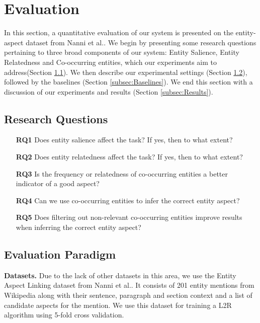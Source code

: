 
\section{Evaluation}
\label{sec:Evaluation}
In this section, a quantitative evaluation of our system is presented on the entity-aspect dataset from Nanni et al.\cite{nanni2018entity}. We begin by presenting some research questions pertaining to three broad components of our system: Entity Salience, Entity Relatedness and Co-occurring entities, which our experiments aim to address(Section \ref{subsec:Research Questions}). We then describe our experimental settings (Section \ref{subsec:Evaluation Paradigm}), followed by the baselines (Section \ref{subsec:Baselines}). We end this section with a discussion of our experiments and results (Section \ref{subsec:Results}).

\subsection{Research Questions}
\label{subsec:Research Questions}

\begin{itemize}
\item[\textbf{RQ1}] Does entity salience affect the task? If yes, then to what extent?
\item[\textbf{RQ2}] Does entity relatedness affect the task? If yes, then to what extent? 
\item[\textbf{RQ3}] Is the frequency or relatedness of co-occurring entities a better indicator of a good aspect?
\item[\textbf{RQ4}] Can we use co-occurring entities to infer the correct entity aspect?
\item[\textbf{RQ5}] Does filtering out non-relevant co-occurring entities improve results when inferring the correct entity aspect?
\end{itemize}

\subsection{Evaluation Paradigm}
\label{subsec:Evaluation Paradigm}

\textbf{Datasets.} Due to the lack of other datasets in this area, we use the Entity Aspect Linking dataset from Nanni et al.\cite{nanni2018entity}. It consists of 201 entity mentions from Wikipedia along with their sentence, paragraph and section context and a list of candidate aspects for the mention. We use this dataset for training a L2R algorithm using 5-fold cross validation. 

